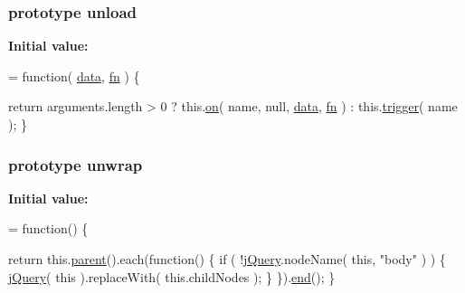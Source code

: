 \subsubsection[{unload}]{ {\bf prototype} unload}\label{jquery-1_810_82-vsdoc_8js_ae048eb914220ef1a45b8cef8fbf97041}
{\bfseries Initial value\+:}
\begin{DoxyCode}
= \textcolor{keyword}{function}( \hyperlink{jquery-1_810_82-vsdoc_8js_a609407b3456fdc3c5671a9fc4a226ff7}{data}, \hyperlink{jquery-1_810_82-vsdoc_8js_acef6bdaf6b9b20fdcca1ea86f0902c3b}{fn} ) \{


        \textcolor{keywordflow}{return} arguments.length > 0 ?
            this.\hyperlink{jquery-1_810_82-vsdoc_8js_ae453b412b883f60220d73468ef6c6dbc}{on}( name, null, \hyperlink{jquery-1_810_82-vsdoc_8js_a609407b3456fdc3c5671a9fc4a226ff7}{data}, \hyperlink{jquery-1_810_82-vsdoc_8js_acef6bdaf6b9b20fdcca1ea86f0902c3b}{fn} ) :
            this.\hyperlink{jquery-1_810_82-vsdoc_8js_a2388c4114d5e3e4eab020f973641519c}{trigger}( name );
    \}
\end{DoxyCode}
\hypertarget{jquery-1_810_82-vsdoc_8js_a3916788ca00ed5d623ae18b843eb1bda}{}
\subsubsection[{unwrap}]{ {\bf prototype} unwrap}\label{jquery-1_810_82-vsdoc_8js_a3916788ca00ed5d623ae18b843eb1bda}
{\bfseries Initial value\+:}
\begin{DoxyCode}
= \textcolor{keyword}{function}() \{


        \textcolor{keywordflow}{return} this.\hyperlink{jquery-1_810_82-vsdoc_8js_aed9b5e7a755bcccb282f9b06c00a6822}{parent}().each(\textcolor{keyword}{function}() \{
            \textcolor{keywordflow}{if} ( !\hyperlink{jquery-1_810_82-vsdoc_8js_add5237586d970a38a81f990e8eb28c6c}{jQuery}.nodeName( \textcolor{keyword}{this}, \textcolor{stringliteral}{"body"} ) ) \{
                \hyperlink{jquery-1_810_82-vsdoc_8js_add5237586d970a38a81f990e8eb28c6c}{jQuery}( \textcolor{keyword}{this} ).replaceWith( this.childNodes );
            \}
        \}).\hyperlink{jquery-1_810_82-vsdoc_8js_af2ce7c86b4e6e9d61f85745258f4ef32}{end}();
    \}
\end{DoxyCode}
\hypertarget{jquery-1_810_82-vsdoc_8js_a0888cacd53defa08fbb4972d54ece4b0}{}
